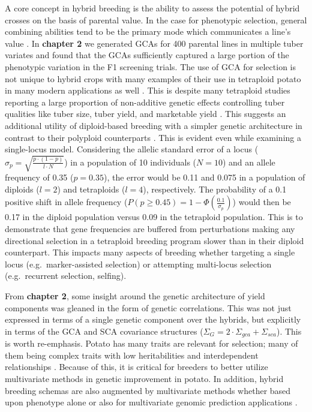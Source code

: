 \documentclass[
]{article}
\begin{document}
A core concept in hybrid breeding is the ability to assess the potential
of hybrid crosses on the basis of parental value. In the case for
phenotypic selection, general combining abilities tend to be the primary
mode which communicates a line's value \autocite{Bertan2007}. In
\textbf{chapter 2} we generated GCAs for 400 parental lines in multiple
tuber variates and found that the GCAs sufficiently captured a large
portion of the phenotypic variation in the F1 screening trials. The use
of GCA for selection is not unique to hybrid crops with many examples of
their use in tetraploid potato in many modern applications as well
\autocite{Neele1991,Bradshaw2003}. This is despite many tetraploid
studies reporting a large proportion of non-additive genetic effects
controlling tuber qualities like tuber size, tuber yield, and marketable
yield \autocites{Plaisted1962}[ ]{Tai1976}{Killick1977}. This suggests
an additional utility of diploid-based breeding with a simpler genetic
architecture in contrast to their polyploid counterparts
\autocite{Osborn2003}. This is evident even while examining a
single-locus model. Considering the allelic standard error of a locus
(\(\sigma_p = \sqrt{\frac{p\cdot (1-p)}{l \cdot N}}\)) in a population
of 10 individuals (\(N = 10\)) and an allele frequency of 0.35
(\(p = 0.35\)), the error would be 0.11 and 0.075 in a population of
diploids (\(l = 2\)) and tetraploids (\(l = 4\)), respectively. The
probability of a 0.1 positive shift in allele frequency
(\(P(p \geq 0.45) = 1 - \Phi\left(\frac{0.1}{\sigma_p}\right)\)) would
then be 0.17 in the diploid population versus 0.09 in the tetraploid
population. This is to demonstrate that gene frequencies are buffered
from perturbations making any directional selection in a tetraploid
breeding program slower than in their diploid counterpart. This impacts
many aspects of breeding whether targeting a single locus
(e.g.~marker-assisted selection) or attempting multi-locus selection
(e.g.~recurrent selection, selfing).

From \textbf{chapter 2}, some insight around the genetic architecture of
yield components was gleaned in the form of genetic correlations. This
was not just expressed in terms of a single genetic component over the
hybrids, but explicitly in terms of the GCA and SCA covariance
structures (\(\Sigma_G = 2 \cdot \Sigma_{gca} + \Sigma_{sca}\)). This is
worth re-emphasis. Potato has many traits are relevant for selection;
many of them being complex traits with low heritabilities and
interdependent relationships \autocite{Gebhardt2013}. Because of this,
it is critical for breeders to better utilize multivariate methods in
genetic improvement in potato. In addition, hybrid breeding schemas are
also augmented by multivariate methods whether based upon phenotype
alone or also for multivariate genomic prediction applications
\autocite{Wang2017}.
\end{document}
